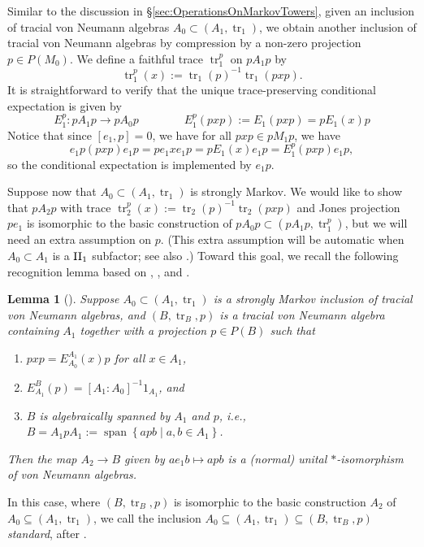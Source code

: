 \documentclass[11pt]{article}
\theoremstyle{plain}
\newtheorem{lem}[thm]{Lemma}
\theoremstyle{definition}
\DeclareMathOperator{\spann}{span}
\DeclareMathOperator{\tr}{tr}
\newcommand{\set}[2]{\left\{#1 \middle| #2\right\}}
\begin{document}
Similar to the discussion in \S\ref{sec:OperationsOnMarkovTowers}, 
given an inclusion of tracial von Neumann algebras $A_0\subset (A_1, \tr_1)$, we obtain another inclusion of tracial von Neumann algebras by compression by a non-zero projection $p\in P(M_0)$.
We define a faithful trace $\tr_1^p$ on $pA_1 p$ by
\begin{equation}
\label{eq:CompressedTrace1}
\tr^p_1(x) := \tr_1(p)^{-1}\tr_1(pxp).
\end{equation}
It is straightforward to verify that the unique trace-preserving conditional expectation is given by 
\begin{equation}
\label{eq:CompressedConditionalExpectation1}
E^p_1 : pA_1p \to pA_{0}p
\qquad
\qquad
E^p_1(pxp) := E_1(pxp) = pE_1(x)p
\end{equation}
Notice that since $[e_1,p] = 0$, we have for all $pxp \in pM_1 p$, we have 
\begin{equation}
\label{eq:CompressionImplementsConditionalExpectation1}
e_1p (pxp) e_1p = p e_1xe_1p = pE_1(x)e_1p = E_1^p(pxp)e_1p,
\end{equation}
so the conditional expectation is implemented by $e_1p$.

Suppose now that $A_0 \subset (A_1, \tr_1)$ is strongly Markov.
We would like to show that $pA_2p$ with trace $\tr^p_2(x):=\tr_2(p)^{-1}\tr_2(pxp)$ and Jones projection $pe_1$
is isomorphic to the basic construction of $pA_0p \subset (pA_1p, \tr_1^p)$, but we will need an extra assumption on $p$.
(This extra assumption will be automatic when $A_0 \subset A_1$ is a ${\rm II}_1$ subfactor; see also \cite[Lem.~2.4]{MR1262294}.)
Toward this goal, we recall the following recognition lemma based on \cite[Prop.~1.2]{MR965748}, \cite[Lem.~5.8]{MR1073519}, and \cite[Lem.~5.3.1]{MR1473221}.

\begin{lem}[{\cite[Lem.~2.15]{MR2812459}}]
\label{lem:BasicConstructionRecognition}
Suppose $A_0 \subset (A_1, \tr_1)$ is a strongly Markov inclusion of tracial von Neumann algebras, and $(B, \tr_B, p)$ is a tracial von Neumann algebra containing $A_1$ together with a projection $p\in P(B)$ such that
\begin{enumerate}[label={\rm(R\arabic*)}]
\item
\label{eq:RecognitionImplement}
$pxp = E_{A_0}^{A_1}(x)p$ for all $x\in A_1$,
\item
\label{eq:RecognitionMarkov}
$E^{B}_{A_1}(p) = [A_1:A_0]^{-1} 1_{A_1}$, and
\item
\label{eq:RecognitionSpan}
$B$ is algebraically spanned by $A_1$ and $p$, i.e., $B = A_1pA_1 := \spann\set{apb}{a,b\in A_1}$.
\end{enumerate}
Then the map $A_2\to B$ given by $ae_1b \mapsto apb$ is a (normal) unital $*$-isomorphism of von Neumann algebras.
\end{lem}
In this case, where $(B,\tr_B,p)$ is isomorphic to the basic construction $A_2$ of $A_0\subseteq (A_1,\tr_1)$, we call the inclusion $A_0\subseteq (A_1,\tr_1)\subseteq (B,\tr_B,p)$ \textit{standard}, after \cite{MR2812459}. 
\end{document}
